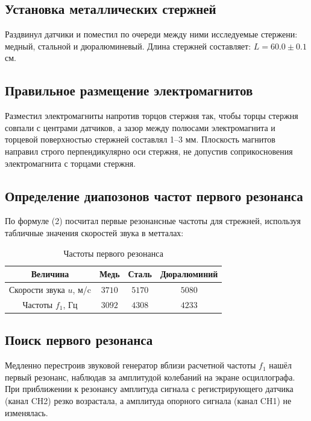 \documentclass[a4paper]{article}
\begin{document}
\subsection{Установка металлических стержней}
\item Раздвинул датчики и поместил по очереди между ними исследуемые стержени: медный, стальной и дюралюминевый. Длина стержней составляет: $L = 60.0\pm0.1 $см.

\subsection{Правильное размещение электромагнитов}
\item Разместил электромагниты напротив торцов стержня так, чтобы
торцы стержня совпали с центрами датчиков, а зазор между полюсами электромагнита и торцевой поверхностью стержней составлял 1–3 мм. Плоскость магнитов направил строго перпендикулярно оси стержня, не допустив соприкосновения электромагнита с торцами стержня.

\subsection{Определение диапозонов частот первого резонанса}
\item По формуле (2) посчитал первые резонансные частоты для стрежней, используя табличные значения скоростей звука в метталах:


\begin{table}[h!]
\centering
\caption{Частоты первого резонанса}
\begin{tabular}{|c|c|c|c|}
\hline
Величина & Медь & Сталь & Дюралюминий \\ \hline
Скорости звука $u$, м/c & $3710$ & $5170$ & $5080$ \\ \hline
Частоты $f_1$, Гц & $3092$ & $4308$ & $4233$ \\ \hline
\end{tabular}
\end{table}

\subsection{Поиск первого резонанса}

\item Медленно перестроив звуковой генератор вблизи расчетной частоты $f_1$ нашёл первый резонанс, наблюдав за амплитудой колебаний на
экране осциллографа. При приближении к резонансу амплитуда сигнала с
регистрирующего датчика (канал CH2) резко возрастала, а амплитуда опорного сигнала (канал CH1) не изменялась.
\end{document}
